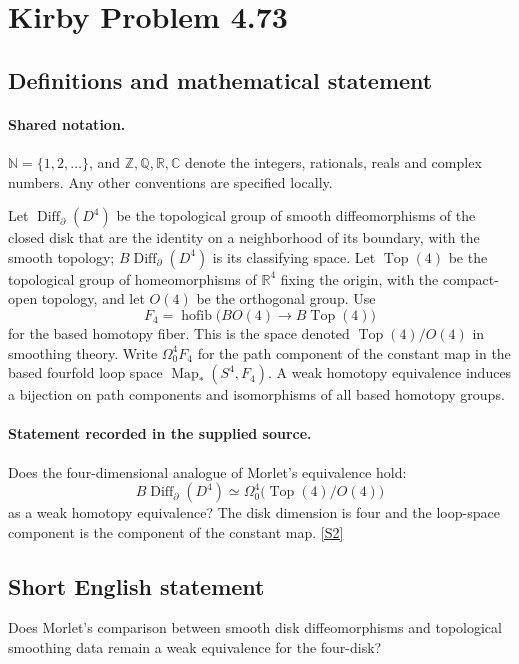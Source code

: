 \documentclass[11pt]{article}
\newcommand{\sref}[2]{\hyperlink{source:#1:#2}{[S#2]}}
\begin{document}
\section{Kirby Problem 4.73}\label{statement}

\subsection{Definitions and mathematical statement}

\paragraph{Shared notation.}$\mathbb N=\{1,2,\ldots\}$, and $\mathbb Z,\mathbb Q,\mathbb R,\mathbb C$ denote the integers, rationals, reals and complex numbers. Any other conventions are specified locally.


Let $\operatorname{Diff}_{\partial}(D^4)$ be the topological group of smooth diffeomorphisms of the closed disk that are the identity on a neighborhood of its boundary, with the smooth topology; $B\operatorname{Diff}_{\partial}(D^4)$ is its classifying space. Let $\operatorname{Top}(4)$ be the topological group of homeomorphisms of $\mathbb R^4$ fixing the origin, with the compact-open topology, and let $O(4)$ be the orthogonal group. Use
\[
F_4=\operatorname{hofib}\bigl(BO(4)\longrightarrow B\operatorname{Top}(4)\bigr)
\]
for the based homotopy fiber. This is the space denoted $\operatorname{Top}(4)/O(4)$ in smoothing theory. Write $\Omega^4_0F_4$ for the path component of the constant map in the based fourfold loop space $\operatorname{Map}_*(S^4,F_4)$. A weak homotopy equivalence induces a bijection on path components and isomorphisms of all based homotopy groups.
\paragraph{Statement recorded in the supplied source.}
Does the four-dimensional analogue of Morlet's equivalence hold:
\[
 B\operatorname{Diff}_{\partial}(D^4)\simeq\Omega^4_0\bigl(\operatorname{Top}(4)/O(4)\bigr)
\]
as a weak homotopy equivalence? The disk dimension is four and the loop-space component is the component of the constant map. \sref{statement}{2}
\subsection{Short English statement}
Does Morlet’s comparison between smooth disk diffeomorphisms and topological smoothing data remain a weak equivalence for the four-disk?
\end{document}
